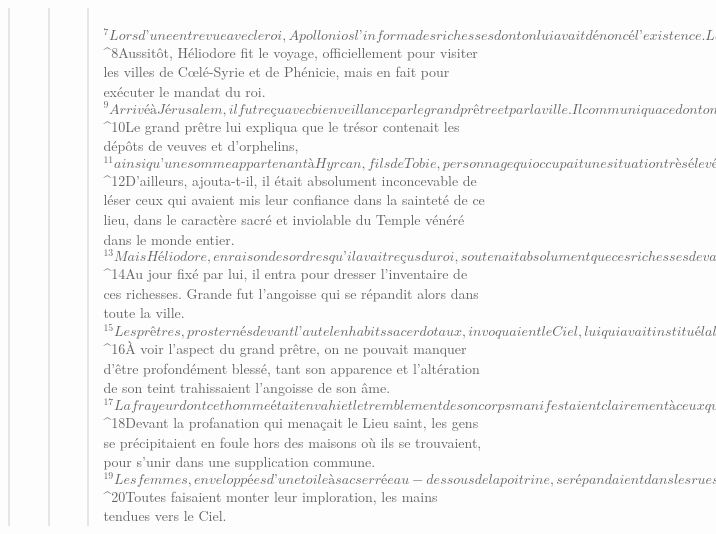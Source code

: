 \begin{verse}
\begin{verse}
\begin{verse}
         
${}^{7}Lors d’une entrevue avec le roi, Apollonios l’informa des richesses dont on lui avait dénoncé l’existence. Le roi désigna Héliodore, qui était à la tête de ses affaires. Il l’envoya avec l’ordre de procéder à l’enlèvement des richesses indiquées. 
${}^{8}Aussitôt, Héliodore fit le voyage, officiellement pour visiter les villes de Cœlé-Syrie et de Phénicie, mais en fait pour exécuter le mandat du roi. 
${}^{9}Arrivé à Jérusalem, il fut reçu avec bienveillance par le grand prêtre et par la ville. Il communiqua ce dont on l’avait informé et il exposa la raison de sa présence. Il désirait savoir, en effet, si tout cela correspondait bien à la réalité. 
${}^{10}Le grand prêtre lui expliqua que le trésor contenait les dépôts de veuves et d’orphelins, 
${}^{11}ainsi qu’une somme appartenant à Hyrcan, fils de Tobie, personnage qui occupait une situation très élevée. Contrairement aux allégations fallacieuses de l’impie Simon, l’ensemble ne comprenait que quatre cents talents d’argent et deux cents talents d’or. 
${}^{12}D’ailleurs, ajouta-t-il, il était absolument inconcevable de léser ceux qui avaient mis leur confiance dans la sainteté de ce lieu, dans le caractère sacré et inviolable du Temple vénéré dans le monde entier.
${}^{13}Mais Héliodore, en raison des ordres qu’il avait reçus du roi, soutenait absolument que ces richesses devaient être confisquées au profit du trésor royal. 
${}^{14}Au jour fixé par lui, il entra pour dresser l’inventaire de ces richesses. Grande fut l’angoisse qui se répandit alors dans toute la ville. 
${}^{15}Les prêtres, prosternés devant l’autel en habits sacerdotaux, invoquaient le Ciel, lui qui avait institué la loi sur les dépôts, pour qu’il garde intacts les biens de ceux qui les avaient mis en dépôt. 
${}^{16}À voir l’aspect du grand prêtre, on ne pouvait manquer d’être profondément blessé, tant son apparence et l’altération de son teint trahissaient l’angoisse de son âme. 
${}^{17}La frayeur dont cet homme était envahi et le tremblement de son corps manifestaient clairement à ceux qui le regardaient la souffrance intime de son cœur. 
${}^{18}Devant la profanation qui menaçait le Lieu saint, les gens se précipitaient en foule hors des maisons où ils se trouvaient, pour s’unir dans une supplication commune. 
${}^{19}Les femmes, enveloppées d’une toile à sac serrée au-dessous de la poitrine, se répandaient dans les rues. Quant aux jeunes filles, habituellement retenues à l’intérieur, les unes couraient vers les portails, d’autres sur les murailles, d’autres encore se penchaient aux fenêtres. 
${}^{20}Toutes faisaient monter leur imploration, les mains tendues vers le Ciel. 

\end{verse}
\end{verse}
\end{verse}
